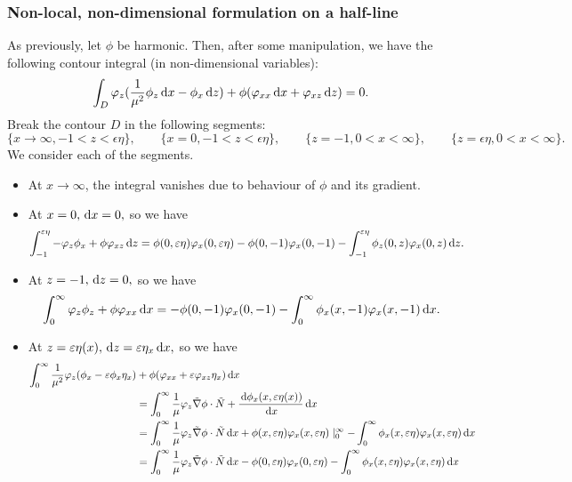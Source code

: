\documentclass[10pt,reqno,oneside,a4paper]{article}
\begin{document}
\subsubsection{Non-local, non-dimensional formulation on a half-line}
As previously, let $\phi$ be harmonic. Then, after some manipulation, we have the following contour integral (in non-dimensional variables):
\begin{equation}\label{contourHL}
\int_D \varphi_z(\frac{1}{\mu^2}\phi_z \,\mathrm{d} x - \phi_x \,\mathrm{d} z) + \phi(\varphi_{xx} \,\mathrm{d} x + \varphi_{xz} \,\mathrm{d} z) = 0.
\end{equation}
Break the contour $D$ in the following segments:
\[ 
\{ x \to \infty, - 1 < z < \epsilon \eta\}, \qquad \{ x = 0, -1 < z < \epsilon\eta\}, \qquad \{ z = -1, 0<x<\infty\}, \qquad \{ z = \epsilon\eta, 0<x<\infty\}.
\]
We consider each of the segments.
\begin{itemize}
\item At $x \to \infty$, the integral vanishes due to behaviour of $\phi$ and its gradient. 
\item At $x = 0, \,\mathrm{d} x = 0,$ so we have 
\begin{align*}
\int_{-1}^{\varepsilon\eta} - \varphi_z \phi_x + \phi \varphi_{xz} \,\mathrm{d} z &= \phi(0, \varepsilon \eta) \varphi_x(0, \varepsilon\eta) - \phi(0, -1) \varphi_x(0, -1) - \int_{-1}^{\varepsilon\eta} \phi_{z}(0,z) \varphi_{x}(0,z) \,\mathrm{d} z. 
\end{align*} 
\item At $z = -1, \,\mathrm{d} z = 0,$ so we have 
\begin{align*}
\int^{\infty}_{0} \varphi_z \phi_z + \phi \varphi_{xx} \,\mathrm{d} x = - \phi(0,-1) \varphi_{x}(0,-1) - \int^{\infty}_{0} \phi_x(x,-1) \varphi_x(x,-1) \,\mathrm{d} x.
\end{align*}
\item At $z =\varepsilon \eta(x), \,\mathrm{d} z = \varepsilon\eta_x \,\mathrm{d} x,$ so we have
\begin{align*}
\int_{0}^{\infty} \frac{1}{\mu^2} \varphi_z(\phi_x - \varepsilon\phi_x \eta_x) &+ \phi(\varphi_{xx}  + \varepsilon \varphi_{xz}\eta_x) \,\mathrm{d} x \\
&=\int_{0}^{\infty} \frac{1}{\mu} \varphi_z \tilde{\nabla} \phi \cdot \tilde{N}+ \frac{\,\mathrm{d} \phi_x(x, \varepsilon \eta(x))}{\,\mathrm{d} x} \,\mathrm{d} x \\
&= \int_{0}^{\infty} \frac{1}{\mu} \varphi_z \tilde{\nabla} \phi\cdot \tilde{N} \,\mathrm{d} x + \phi(x, \varepsilon \eta) \varphi_x(x, \varepsilon\eta) \mid^{\infty}_{0} - \int^{\infty}_{0}\phi_x(x, \varepsilon\eta)  \varphi_x(x, \varepsilon \eta) \,\mathrm{d} x \\
&= \int_{0}^{\infty} \frac{1}{\mu} \varphi_z \tilde{\nabla} \phi \cdot \tilde{N} \,\mathrm{d} x - \phi(0, \varepsilon \eta) \varphi_x(0, \varepsilon\eta) - \int^{\infty}_{0}\phi_x(x, \varepsilon\eta)  \varphi_x(x, \varepsilon \eta) \,\mathrm{d} x 
\end{align*}
 \end{itemize}
\end{document}
